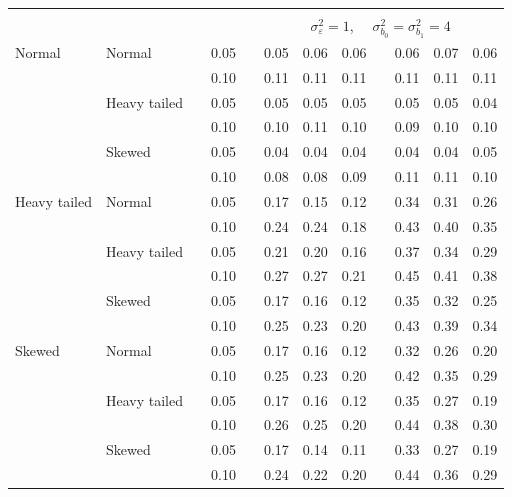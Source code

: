 \documentclass[12pt]{article} %
\begin{document}
\begin{table}[ht]
\begin{scriptsize}
\begin{center}
\begin{tabular}{ll p{.1cm} c p{.1cm} rrr p{.1cm} rrr}
&&&&&&&&&&&\\
& && && \multicolumn{7}{c}{$\sigma_{\varepsilon}^2 = 1$, \ \ $\sigma_{b_0}^2 = \sigma_{b_1}^2 = 4$} \\ \cline{6-12}
Normal       & Normal       && 0.05 &&  0.05 & 0.06 & 0.06 && 0.06 & 0.07 & 0.06 \\ 
             &              && 0.10 &&  0.11 & 0.11 & 0.11 && 0.11 & 0.11 & 0.11 \\ 
             & Heavy tailed && 0.05 &&  0.05 & 0.05 & 0.05 && 0.05 & 0.05 & 0.04 \\ 
             &              && 0.10 &&  0.10 & 0.11 & 0.10 && 0.09 & 0.10 & 0.10 \\ 
             & Skewed       && 0.05 &&  0.04 & 0.04 & 0.04 && 0.04 & 0.04 & 0.05 \\ 
             &              && 0.10 &&  0.08 & 0.08 & 0.09 && 0.11 & 0.11 & 0.10 \\ 
Heavy tailed & Normal       && 0.05 &&  0.17 & 0.15 & 0.12 && 0.34 & 0.31 & 0.26 \\ 
             &              && 0.10 &&  0.24 & 0.24 & 0.18 && 0.43 & 0.40 & 0.35 \\ 
             & Heavy tailed && 0.05 &&  0.21 & 0.20 & 0.16 && 0.37 & 0.34 & 0.29 \\ 
             &              && 0.10 &&  0.27 & 0.27 & 0.21 && 0.45 & 0.41 & 0.38 \\ 
             & Skewed       && 0.05 &&  0.17 & 0.16 & 0.12 && 0.35 & 0.32 & 0.25 \\ 
             &              && 0.10 &&  0.25 & 0.23 & 0.20 && 0.43 & 0.39 & 0.34 \\ 
Skewed       & Normal       && 0.05 &&  0.17 & 0.16 & 0.12 && 0.32 & 0.26 & 0.20 \\ 
             &              && 0.10 &&  0.25 & 0.23 & 0.20 && 0.42 & 0.35 & 0.29 \\ 
             & Heavy tailed && 0.05 &&  0.17 & 0.16 & 0.12 && 0.35 & 0.27 & 0.19 \\ 
             &              && 0.10 &&  0.26 & 0.25 & 0.20 && 0.44 & 0.38 & 0.30 \\ 
             & Skewed       && 0.05 &&  0.17 & 0.14 & 0.11 && 0.33 & 0.27 & 0.19 \\ 
             &              && 0.10 &&  0.24 & 0.22 & 0.20 && 0.44 & 0.36 & 0.29 \\ 

\hline
\end{tabular}
\end{center}
\end{scriptsize}
\end{table}
\end{document}
